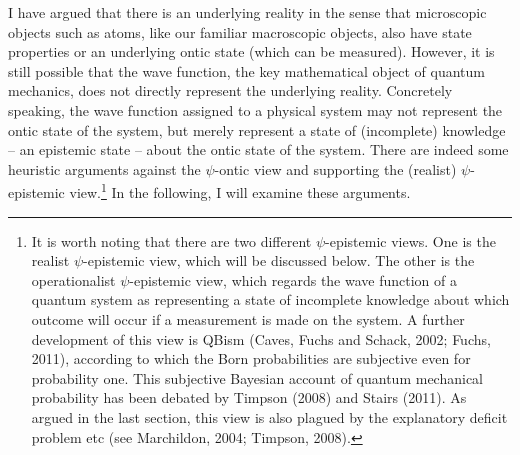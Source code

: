 I have argued that there is an underlying reality in the sense that microscopic objects such as atoms, like our familiar macroscopic objects, also have state properties or an underlying ontic state (which can be measured). However, it is still possible that the wave function, the key mathematical object of quantum mechanics, does not directly represent the underlying reality. Concretely speaking, the wave function assigned to a physical system may not represent the ontic state of the system, but merely represent a state of (incomplete) knowledge -- an epistemic state -- about the ontic state of the system. There are indeed some heuristic arguments against the $\psi$-ontic view and supporting the (realist) $\psi$-epistemic view.\footnote{It is worth noting that there are two different $\psi$-epistemic views. One is the realist $\psi$-epistemic view, which will be discussed below. The other is the operationalist $\psi$-epistemic view, which regards the wave function of a quantum system as representing a state of incomplete knowledge about which outcome will occur if a measurement is made on the system. A further development of this view is QBism (Caves, Fuchs and Schack, 2002; Fuchs, 2011), according to which the Born probabilities are subjective even for probability one. This subjective Bayesian account of quantum mechanical probability has been debated by Timpson (2008) and Stairs (2011). As argued in the last section, this view is also plagued by the explanatory deficit problem etc (see Marchildon, 2004; Timpson, 2008).} In the following, I will examine these arguments.


